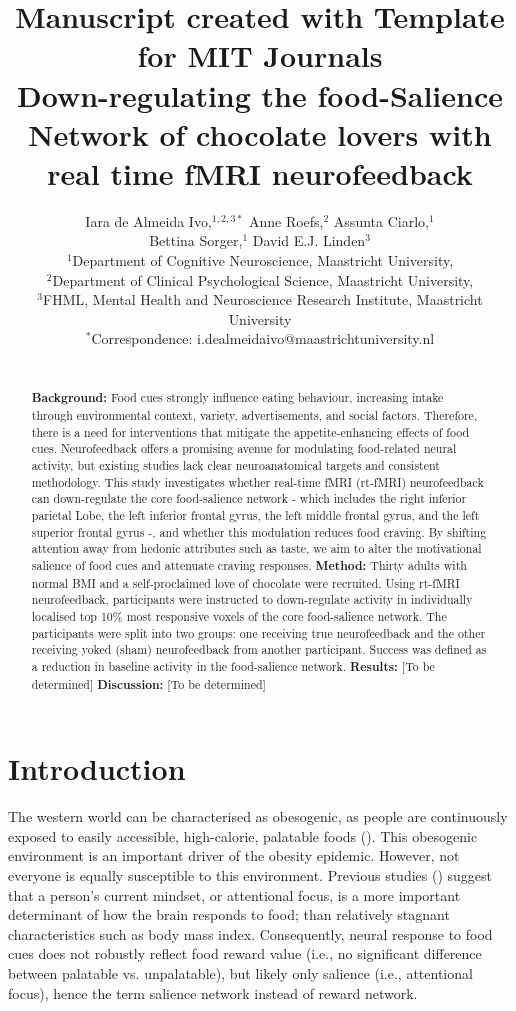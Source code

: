 \documentclass[]{imag-ms-template}
\title{
{\small Manuscript created with Template for MIT Journals} \\
{Down-regulating the food-Salience Network of chocolate lovers with real time fMRI neurofeedback}
}
\author {Iara de Almeida Ivo,$^{1,2,3\ast}$ Anne Roefs,$^{2}$ Assunta Ciarlo,$^{1}$ \\ Bettina Sorger,$^{1}$ David E.J. Linden$^{3}$\\
{\small $^{1}$Department of Cognitive Neuroscience, Maastricht University,}\\
{\small $^{2}$Department of Clinical Psychological Science, Maastricht University,}\\
{\small $^{3}$FHML, Mental Health and Neuroscience Research Institute, Maastricht University}\\
{\small $^\ast$Correspondence:  i.dealmeidaivo@maastrichtuniversity.nl}
}
\begin{document}
 

\maketitle 


\begin{abstract}
  \\\textbf{Background:} Food cues strongly influence eating behaviour, increasing intake through environmental context, variety, advertisements, and social factors. Therefore, there is a need for interventions that mitigate the appetite-enhancing effects of food cues. Neurofeedback offers a promising avenue for modulating food-related neural activity, but existing studies lack clear neuroanatomical targets and consistent methodology. This study investigates whether real-time fMRI (rt-fMRI) neurofeedback can down-regulate the core food-salience network - which includes the right inferior parietal Lobe, the left inferior frontal gyrus, the left middle frontal gyrus, and the left superior frontal gyrus -, and whether this modulation reduces food craving. By shifting attention away from hedonic attributes such as taste, we aim to alter the motivational salience of food cues and attenuate craving responses. \textbf{Method:} Thirty adults with normal BMI and a self-proclaimed love of chocolate were recruited. Using rt-fMRI neurofeedback, participants were instructed to down-regulate activity in individually localised top 10\% most responsive voxels of the core food-salience network. The participants were split into two groups: one receiving true neurofeedback and the other receiving yoked (sham) neurofeedback from another participant. Success was defined as a reduction in baseline activity in the food-salience network.
  \textbf{Results:} [To be determined] \textbf{Discussion:} [To be determined]
\end{abstract}

\section{Introduction}

The western world can be characterised as obesogenic, as people are continuously exposed to easily accessible, high-calorie, palatable foods (\cite{hillObesityOverviewEpidemic2005}). This obesogenic environment is an important driver of the obesity epidemic. However, not everyone is equally susceptible to this environment. Previous studies (\cite{frankortRewardActivitySatiated2012, franssenPowerMindAttentional2020, franssenEffectsMindsetHormonal2022, pimpiniMoreComplexYou2022, kochsItMatterPerspective2023}) suggest that a person’s current mindset, or attentional focus, is a more important determinant of how the brain responds to food; than relatively stagnant characteristics such as body mass index. Consequently, neural response to food cues does not robustly reflect food reward value (i.e., no significant difference between palatable vs. unpalatable), but likely only salience (i.e., attentional focus), hence the term salience network instead of reward network.
\end{document}
